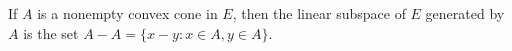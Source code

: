 If $A$ is a nonempty convex cone in $E$, then the linear subspace of $E$ generated by $A$ is the set $A - A = \{x - y : x \in A, y \in A\}$.